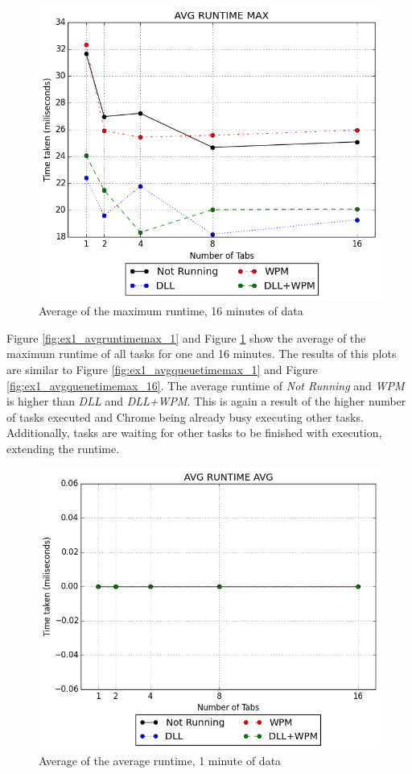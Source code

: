 \begin{figure}[!htbp]
	\centering
    \includegraphics[width=\textwidth,keepaspectratio]{Evaluation/experiment1/AVG-RUNTIME-MAX-16.png}
    \caption{Average of the maximum runtime, 16 minutes of data}
    \label{fig:ex1_avgruntimemax_16}
\end{figure}
Figure \ref{fig:ex1_avgruntimemax_1} and Figure \ref{fig:ex1_avgruntimemax_16} show the average of the maximum runtime of all tasks for one and 16 minutes. The results of this plots are similar to Figure \ref{fig:ex1_avgqueuetimemax_1} and Figure \ref{fig:ex1_avgqueuetimemax_16}. The average runtime of \emph{Not Running} and \emph{WPM} is higher than \emph{DLL} and \emph{DLL+WPM}. This is again a result of the higher number of tasks executed and Chrome being already busy executing other tasks. Additionally, tasks are waiting for other tasks to be finished with execution, extending the runtime.
\begin{figure}[!htbp]
	\centering
    \includegraphics[width=\textwidth,keepaspectratio]{Evaluation/experiment1/AVG-RUNTIME-AVG-1.png}
    \caption{Average of the average runtime, 1 minute of data}
    \label{fig:ex1_avgruntimeavg_1}
\end{figure}
